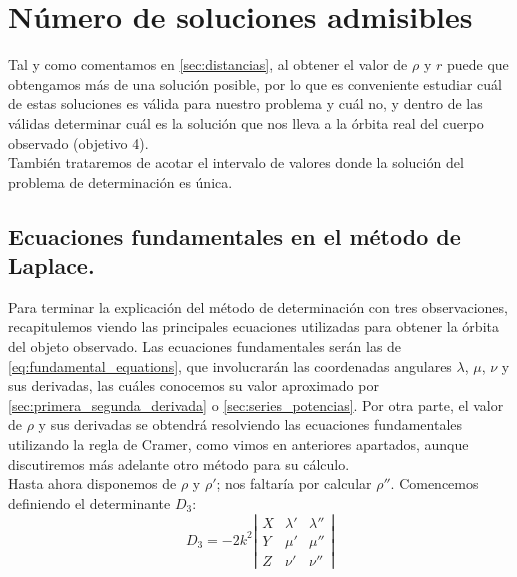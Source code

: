 \chapter{Número de soluciones admisibles}
\label{chap:soluciones_admisibles}
Tal y como comentamos en \ref{sec:distancias}, al obtener el valor de $\rho$ y $r$ puede que obtengamos más de una solución posible, por lo que es conveniente estudiar cuál de estas soluciones es válida para nuestro problema y cuál no, y dentro de las válidas determinar cuál es la solución que nos lleva a la órbita real del cuerpo observado (objetivo 4).\\

También trataremos de acotar el intervalo de valores donde la solución del problema de determinación es única.\\

\section{Ecuaciones fundamentales en el método de Laplace.}
\label{sec:fundamental_equations}
Para terminar la explicación del método de determinación con tres observaciones, recapitulemos viendo las principales ecuaciones utilizadas para obtener la órbita del objeto observado. Las ecuaciones fundamentales serán las de \eqref{eq:fundamental_equations}, que involucrarán las coordenadas angulares $\lambda$, $\mu$, $\nu$ y sus derivadas, las cuáles conocemos su valor aproximado por \ref{sec:primera_segunda_derivada} o \ref{sec:series_potencias}. Por otra parte, el valor de $\rho$ y sus derivadas se obtendrá resolviendo las ecuaciones fundamentales utilizando la regla de Cramer, como vimos en anteriores apartados, aunque discutiremos más adelante otro método para su cálculo.\\

Hasta ahora disponemos de $\rho$ y $\rho'$; nos faltaría por calcular $\rho''$. Comencemos definiendo el determinante $D_3$:
\[
D_3=-2k^2
\left|
\begin{array}{ccc}
X & \lambda' & \lambda''\\
Y & \mu' & \mu''\\
Z & \nu' & \nu''
\end{array}
\right|
\]


